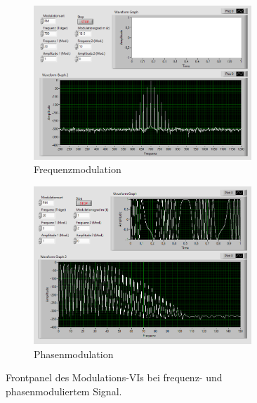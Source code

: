 	\newpage
	\pagestyle{empty}
	\begin{figure}[H]
		\centering
		\begin{subfigure}[c]{\textwidth}
			\centering
			\includegraphics[width=0.9\textwidth]{pic/fm_example.png}
			\caption{Frequenzmodulation}
			\label{fig:fm_example}	
		\end{subfigure}
		\vspace{0.5cm}
		\begin{subfigure}[c]{\textwidth}
			\centering
			\includegraphics[width=0.9\textwidth]{pic/pm_example.png}
			\caption{Phasenmodulation}
			\label{fig:pm_example}	
		\end{subfigure}
		\caption{Frontpanel des Modulations-VIs bei frequenz- und phasenmoduliertem Signal.}
	\end{figure} 
	
